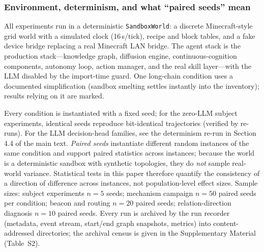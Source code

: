 \documentclass[10pt]{article}
\begin{document}
\subsubsection{Environment, determinism, and what ``paired seeds'' mean}
\label{sec:method-env}
All experiments run in a deterministic \texttt{SandboxWorld}: a discrete Minecraft-style grid world with a simulated clock (16\,s/tick), recipe and block tables, and a fake device bridge replacing a real Minecraft LAN bridge. The agent stack is the production stack---knowledge graph, diffusion engine, continuous-cognition components, autonomy loop, action manager, and the real skill layer---with the LLM disabled by the import-time guard. One long-chain condition uses a documented simplification (sandbox smelting settles instantly into the inventory); results relying on it are marked.

Every condition is instantiated with a fixed seed; for the zero-LLM subject experiments, identical seeds reproduce bit-identical trajectories (verified by re-runs). For the LLM decision-head families, see the determinism re-run in Section 4.4 of the main text. \emph{Paired seeds} instantiate different random instances of the same condition and support paired statistics across instances; because the world is a deterministic sandbox with synthetic topologies, they do \emph{not} sample real-world variance. Statistical tests in this paper therefore quantify the consistency of a direction of difference across instances, not population-level effect sizes. Sample sizes: subject experiments $n{=}5$ seeds; mechanism campaign $n{=}50$ paired seeds per condition; beacon and routing $n{=}20$ paired seeds; relation-direction diagnosis $n{=}10$ paired seeds. Every run is archived by the run recorder (metadata, event stream, start/end graph snapshots, metrics) into content-addressed directories; the archival census is given in the Supplementary Material (Table~S2).
\end{document}
